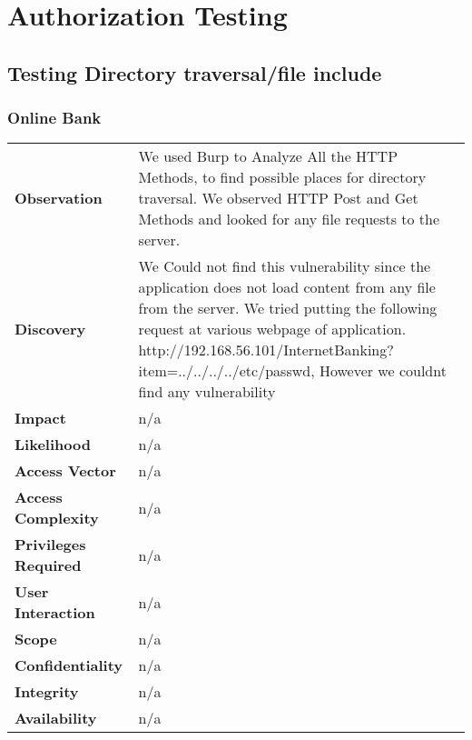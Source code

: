 \clearpage

\section{Authorization Testing}

\subsection{Testing Directory traversal/file include}
\subsubsection{Online Bank}
\begin{tabular}{l|p{10cm}}
\textbf{Observation} & We used Burp to Analyze All the HTTP Methods, to find possible places for directory traversal. We observed HTTP Post and Get Methods and looked for any file requests to the server.  \\
\textbf{Discovery} & We Could not find this vulnerability since the application does not load content from any file from the server. We tried putting the following request at various webpage of application. http://192.168.56.101/InternetBanking?item=../../../../etc/passwd, However we couldnt find any vulnerability \\
\textbf{Impact} &  n/a\\
\textbf{Likelihood} & n/a \\
\textbf{Access Vector} & n/a \\
\textbf{Access Complexity} & n/a \\
\textbf{Privileges Required} & n/a \\
\textbf{User Interaction} & n/a \\
\textbf{Scope} & n/a \\
\textbf{Confidentiality} & n/a \\
\textbf{Integrity} & n/a \\
\textbf{Availability} & n/a \\
\end{tabular}


